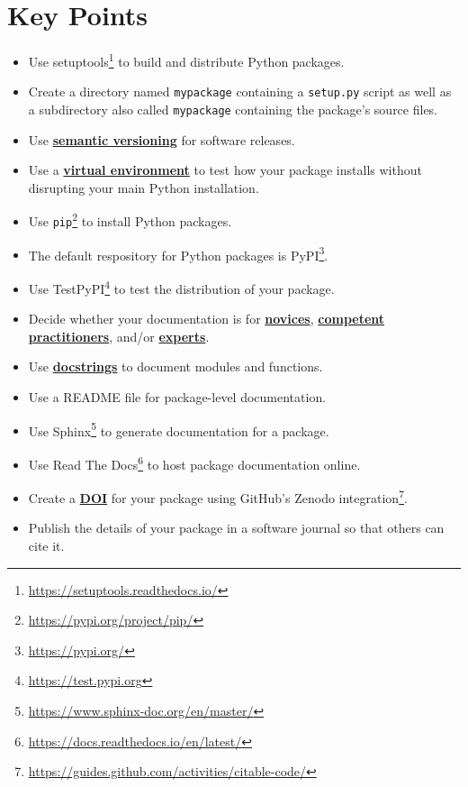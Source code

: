 \documentclass[
]{krantz}
\providecommand{\tightlist}{%
  \setlength{\itemsep}{0pt}\setlength{\parskip}{0pt}}
\renewcommand{\href}[2]{#2\footnote{\url{#1}}}
\newcommand{\gref}[2]{\hyperlink{#2}{\textbf{#1}}}
\begin{document}
\hypertarget{packaging-keypoints}{%
\section{Key Points}\label{packaging-keypoints}}

\begin{itemize}
\tightlist
\item
  Use \href{https://setuptools.readthedocs.io/}{setuptools} to build and distribute Python packages.
\item
  Create a directory named \texttt{mypackage} containing a \texttt{setup.py} script
  as well as a subdirectory also called \texttt{mypackage} containing the package's source files.
\item
  Use \gref{semantic versioning}{semantic\_versioning} for software releases.
\item
  Use a \gref{virtual environment}{virtual\_environment} to test how your package installs
  without disrupting your main Python installation.\\
\item
  Use \href{https://pypi.org/project/pip/}{\texttt{pip}} to install Python packages.
\item
  The default respository for Python packages is \href{https://pypi.org/}{PyPI}.
\item
  Use \href{https://test.pypi.org}{TestPyPI} to test the distribution of your package.
\item
  Decide whether your documentation is for \gref{novices}{novice},
  \gref{competent practitioners}{competent\_practitioner}, and/or \gref{experts}{expert}.
\item
  Use \gref{docstrings}{docstring} to document modules and functions.
\item
  Use a README file for package-level documentation.
\item
  Use \href{https://www.sphinx-doc.org/en/master/}{Sphinx} to generate documentation for a package.
\item
  Use \href{https://docs.readthedocs.io/en/latest/}{Read The Docs} to host package documentation online.
\item
  Create a \gref{DOI}{doi} for your package using \href{https://guides.github.com/activities/citable-code/}{GitHub's Zenodo integration}.
\item
  Publish the details of your package in a software journal so that others can cite it.
\end{itemize}
\end{document}
